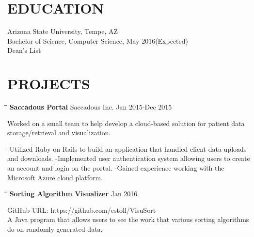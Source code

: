 \documentclass{res}
\begin{document}
 


\address{estoll@asu.edu\\(480) 338-2918}

                                  
\begin{resume}
 
\section{EDUCATION}
\vspace{0.05in}          
    Arizona State University, Tempe, AZ  \\        
    Bachelor of Science, Computer Science, May 2016(Expected)   \\Dean's List       

 
\section{PROJECTS}
   \vspace{0.05in}	
   \begin{tabbing}
   \hspace{2.3in}\= \hspace{2.6in}\= \kill %
    {\bf Saccadous Portal} \>Saccadous Inc.     \>Jan 2015-Dec 2015\\
   \end{tabbing}\vspace{-30pt}      %
    Worked on a small team to help develop a cloud-based solution for patient data storage/retrieval and visualization.
    
    -Utilized Ruby on Rails to build an application that handled client data uploads and downloads.
    -Implemented user authentication system allowing users to create an account and login on the portal.
    -Gained experience working with the Microsoft Azure cloud platform.
    
    
    \begin{tabbing}
    	\hspace{2.3in}\= \hspace{2.6in}\= \kill %
    	{\bf Sorting Algorithm Visualizer}     \>\>Jan 2016\\
    \end{tabbing}
    \vspace{-30pt}      %
    GitHub URL: https://github.com/estoll/VisuSort
    \\A Java program that allows users to see the work that various sorting algorithms do on randomly generated data.
    

\end{resume}
\end{document}
